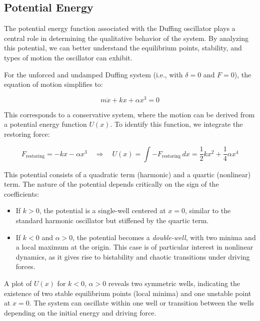 \documentclass{article}
\begin{document}
\subsection{Potential Energy}

The potential energy function associated with the Duffing oscillator plays a central role in determining the qualitative behavior of the system. By analyzing this potential, we can better understand the equilibrium points, stability, and types of motion the oscillator can exhibit.

For the unforced and undamped Duffing system (i.e., with $\delta = 0$ and $F = 0$), the equation of motion simplifies to:

\begin{equation}
    m\ddot{x} + kx + \alpha x^3 = 0
\end{equation}

This corresponds to a conservative system, where the motion can be derived from a potential energy function $U(x)$. To identify this function, we integrate the restoring force:

\begin{equation}
    F_{\text{restoring}} = -kx - \alpha x^3 \quad \Rightarrow \quad U(x) = \int -F_{\text{restoring}} \, dx = \frac{1}{2}kx^2 + \frac{1}{4}\alpha x^4
\end{equation}

This potential consists of a quadratic term (harmonic) and a quartic (nonlinear) term. The nature of the potential depends critically on the sign of the coefficients:

\begin{itemize}
    \item If $k > 0$, the potential is a single-well centered at $x = 0$, similar to the standard harmonic oscillator but stiffened by the quartic term.
    \item If $k < 0$ and $\alpha > 0$, the potential becomes a \textit{double-well}, with two minima and a local maximum at the origin. This case is of particular interest in nonlinear dynamics, as it gives rise to bistability and chaotic transitions under driving forces.
\end{itemize}

A plot of $U(x)$ for $k < 0$, $\alpha > 0$ reveals two symmetric wells, indicating the existence of two stable equilibrium points (local minima) and one unstable point at $x = 0$. The system can oscillate within one well or transition between the wells depending on the initial energy and driving force.
\end{document}
